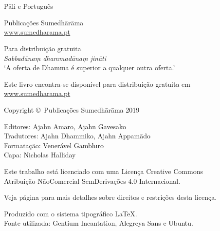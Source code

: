 
\thispagestyle{empty}

\enlargethispage{\baselineskip}

{\centering\small
\setlength{\parskip}{15pt}

{\normalsize
\thetitle\\
\thesubtitle\\
Pāli e Português}

Publicações Sumedhārāma\\
\href{http://sumedharama.pt}{www.sumedharama.pt}

Para distribuição gratuita\\
\textit{Sabbadānaṃ dhammadānaṃ jināti}\\
‘A oferta de Dhamma é superior a qualquer outra oferta.’

Este livro encontra-se disponível para distribuição gratuita em\\
\href{http://sumedharama.pt}{www.sumedharama.pt}


Copyright \copyright\ Publicações Sumedhārāma 2019

Editores: Ajahn Amaro, Ajahn Gavesako\\
Tradutores: Ajahn Dhammiko, Ajahn Appamādo\\
Formatação: Venerável Gambhīro\\
Capa: Nicholas Halliday

\vfill

Este trabalho está licenciado com uma Licença Creative Commons\\
Atribuição-NãoComercial-SemDerivações 4.0 Internacional.

Veja página \pageref{copyright-details} para mais detalhes sobre direitos e restrições desta licença.

Produzido com o sistema tipográfico \LaTeX.\\
Fonte utilizada: Gentium Incantation, Alegreya Sans e Ubuntu.

\theEditionInfo

}
